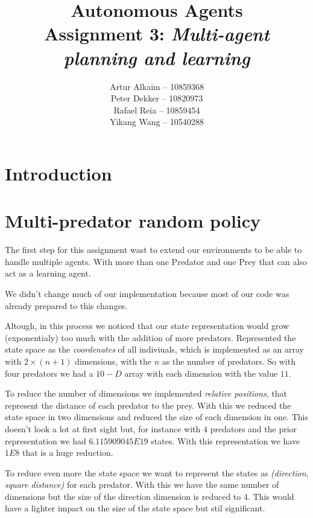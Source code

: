 \documentclass{article}
\begin{document}
\title{Autonomous Agents\\
Assignment 3: \emph{Multi-agent planning and learning}}
\author{
Artur Alkaim -- 10859368\\
Peter Dekker -- 10820973\\
Rafael Reia -- 10859454\\
Yikang Wang -- 10540288\\
}
\maketitle
\section{Introduction}

\section{Multi-predator random policy}
The first step for this assignment wast to extend our environments to be able to
handle multiple agents. With more than one Predator and one Prey that can also
act as a learning agent.

We didn't change much of our implementation because most of our code was
already prepared to this changes.

Altough, in this process we noticed that our state representation would grow
(exponentialy) too much with the addition of more predators. Represented the
state space as the \emph{coordenates} of all indiviuals, which is implemented as
an array with $2 \times (n+1)$ dimensions, with the $n$ as the number of predators. So with four predators we had a $10-D$ array with each
dimension with the value $11$. 

To reduce the number of dimensions we implemented \emph{relative positions},
that represent the distance of each predator to the prey. With this we reduced the
state space in two dimensions and reduced the size of each dimension in one.
This doesn't look a lot at first sight but, for instance with $4$ predators and
the prior representation we had $6.115909045E19$ states. With this
representation we have $1E8$ that is a huge reduction.

To reduce even more the state space we want to represent the states as
\emph{(direction, square distance)} for each predator. With this we have the
same number of dimensions but the size of the direction dimension is reduced to $4$.
This would have a lighter impact on the size of the state space but stil
significant.
\end{document}

